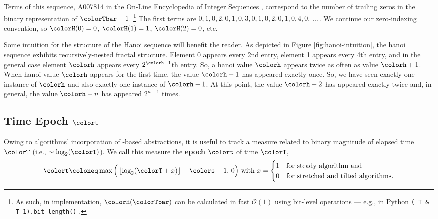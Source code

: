 Terms of this sequence, A007814 in the On-Line Encyclopedia of Integer Sequences \citep{oeis}, correspond to the number of trailing zeros in the binary representation of $\colorTbar + 1$.%
\footnote{%
As such, in implementation, $\colorH(\colorTbar)$ can be calculated in fast $\mathcal{O}(1)$ using bit-level operations --- e.g., in Python \texttt{(~T \& T-1).bit\_length()} \citep{oeis}.
}
The first terms are $0,\allowbreak 1,\allowbreak 0,\allowbreak 2,\allowbreak 0,\allowbreak 1,\allowbreak 0,\allowbreak 3,\allowbreak 0,\allowbreak 1,\allowbreak 0,\allowbreak 2,\allowbreak 0,\allowbreak 1,\allowbreak 0,\allowbreak 4,\allowbreak 0,\allowbreak \,\ldots \,$.
We continue our zero-indexing convention, so $\colorH(0) = 0$, $\colorH(1) = 1$, $\colorH(2) = 0$, etc.

Some intuition for the structure of the Hanoi sequence will benefit the reader.
As depicted in Figure \ref{fig:hanoi-intuition}, the hanoi sequence exhibits recursively-nested fractal structure.
Element 0 appears every 2nd entry, element 1 appears every 4th entry, and in the general case element $\colorh$ appears every $2^{\colorh+1}$th entry.
So, a hanoi value $\colorh$ appears twice as often as value $\colorh + 1$.
When hanoi value $\colorh$ appears for the first time, the value $\colorh - 1$ has appeared exactly once.
So, we have seen exactly one instance of $\colorh$ and also exactly one instance of $\colorh - 1$.
At this point, the value $\colorh - 2$ has appeared exactly twice and, in general, the value $\colorh - n$ has appeared $2^{n - 1}$ times.



\subsection{Time Epoch $\colort$}
\label{sec:notation-epoch}

Owing to algorithms' incorporation of \hv{}-based abstractions, it is useful to track a measure related to binary magnitude of elapsed time $\colorT$ (i.e., $\sim \log_2(\colorT)$).
We call this measure the \textbf{epoch} $\colort$ of time $\colorT$,
\begin{equation}
\colort
\coloneq
\max\Big(\left\lfloor \log_2(\colorT+x) \right\rfloor - \colors + 1,\, 0\Big)
\text{ with }
x =
\begin{cases}
1 & \text{for steady algorithm and} \\
0 & \text{for stretched and tilted algorithms.}
\end{cases}
\label{eqn:epoch-defn}
\end{equation}

